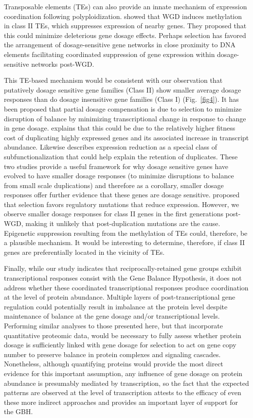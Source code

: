 \documentclass[11pt]{article}
\begin{document}
Transposable elements (TEs) can also provide an innate mechanism of expression coordination following polyploidization.
\citep{zhang2015} showed that WGD induces methylation in class II TEs, which suppresses expression of nearby genes.
They proposed that this could minimize deleterious gene dosage effects.
Perhaps selection has favored the arrangement of dosage-sensitive gene networks in close proximity to DNA elements facilitating coordinated suppression of gene expression within dosage-sensitive networks post-WGD.

This TE-based mechanism would be consistent with our observation that putatively dosage sensitive gene families (Class II) show smaller average dosage responses than do dosage insensitive gene families (Class I) (Fig.~\ref{fig4}). It has been proposed that partial dosage compensation is due to selection to minimize disruption of balance by minimizing transcriptional change in response to change in gene dosage. \cite{katju2018} explains that this could be due to the relatively higher fitness cost of duplicating highly expressed genes and its associated increase in transcript abundance. Likewise \cite{qian2010} describes expression reduction as a special class of subfunctionalization that could help explain the retention of duplicates. These two studies provide a useful framework for why dosage sensitive genes have evolved to have smaller dosage responses (to minimize disruptions to balance from small scale duplications) and therefore as a corollary, smaller dosage responses offer further evidence that these genes are dosage sensitive. \cite{qian2010} proposed that selection favors regulatory mutations that reduce expression. However, we observe smaller dosage responses for class II genes in the first generations post-WGD, making it unlikely that post-duplication mutations are the cause. Epigenetic suppression resulting from the methylation of TEs could, therefore, be a plausible mechanism. It would be interesting to determine, therefore, if class II genes are preferentially located in the vicinity of TEs.

	Finally, while our study indicates that reciprocally-retained gene groups exhibit transcriptional responses consist with the Gene Balance Hypothesis, it does not address whether these coordinated transcriptional responses produce coordination at the level of protein abundance. Multiple layers of post-transcriptional gene regulation could potentially result in imbalance at the protein level despite maintenance of balance at the gene dosage and/or transcriptional levels. Performing similar analyses to those presented here, but that incorporate quantitative proteomic data, would be necessary to fully assess whether protein dosage is sufficiently linked with gene dosage for selection to act on gene copy number to preserve balance in protein complexes and signaling cascades. Nonetheless, although quantifying proteins would provide the most direct evidence for this important assumption, any influence of gene dosage on protein abundance is presumably mediated by transcription, so the fact that the expected patterns are observed at the level of transcription attests to the efficacy of even these more indirect approaches and provides an important layer of support for the GBH.
\end{document}
